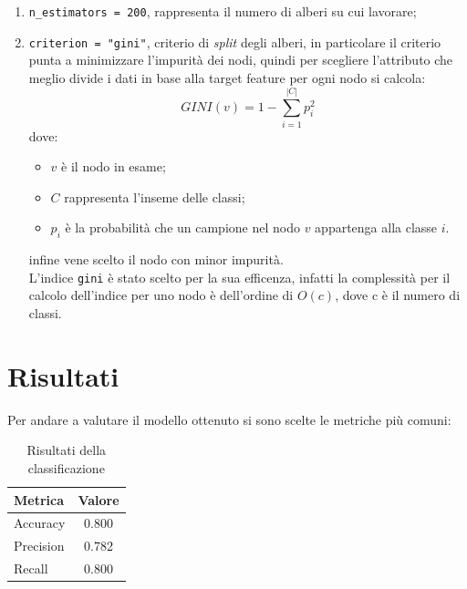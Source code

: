 \documentclass[italian,10pt,a4paper]{article}
\begin{document}
			\begin{enumerate}
				
				\item \texttt{n\_estimators = 200}, rappresenta il numero di alberi su cui lavorare;
				\item  \texttt{criterion = "gini"}, criterio di \textit{split} degli alberi, in particolare il criterio punta a minimizzare l'impurità dei nodi, quindi per scegliere l'attributo che meglio divide i dati in base alla target feature per ogni nodo si calcola:
				$$GINI(v) = 1-\sum_{i = 1}^{|C|}p_i^2$$
				dove:
				\begin{itemize}
					\item $v$ è il nodo in esame;
					\item $C$ rappresenta l'inseme delle classi;
					\item $p_i$ è la probabilità che un campione nel nodo $v$ appartenga alla classe $i$.
				\end{itemize}
				infine vene scelto il nodo con minor impurità. \\
				\linebreak
				L'indice \texttt{gini} è stato scelto per la sua efficenza, infatti la complessità per il calcolo dell'indice per uno nodo è dell'ordine di $O(c)$, dove c è il numero di classi.
				
		\end{enumerate}

	\section{Risultati}
		Per andare a valutare il modello ottenuto si sono scelte le metriche più comuni:
		
		\begin{table}[h]
			\centering
			\begin{tabular}{|l|c|}
				\hline
				\textbf{Metrica} & \textbf{Valore} \\
				\hline
				Accuracy & 0.800 \\
				\hline
				Precision & 0.782 \\
				\hline
				Recall & 0.800 \\
				\hline
			\end{tabular}
			\caption{Risultati della classificazione}
		\end{table}
		
\end{document}
